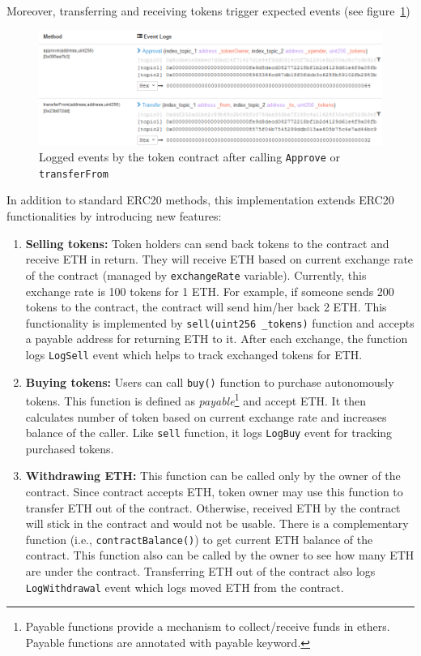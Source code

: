 Moreover, transferring and receiving tokens trigger expected events (see figure~\ref{fig:proptran})

\begin{figure}[t]
	\centering
	\includegraphics[width=1.0\linewidth]{figures/img18.png}
	\caption{Logged events by the token contract after calling \texttt{Approve} or \texttt{transferFrom}}
	\label{fig:proptran}
\end{figure}

In addition to standard ERC20 methods, this implementation extends ERC20 functionalities by introducing new features:

\begin{enumerate}
	\item \textbf{Selling tokens:} Token holders can send back tokens to the contract and receive ETH in return. They will receive ETH based on current exchange rate of the contract (managed by \texttt{exchangeRate} variable). Currently, this exchange rate is 100 tokens for 1 ETH. For example, if someone sends 200 tokens to the contract, the contract will send him/her back 2 ETH. This functionality is implemented by \texttt{sell(uint256 \_tokens)} function and accepts a payable address for returning ETH to it. After each exchange, the function logs \texttt{LogSell} event which helps to track exchanged tokens for ETH.
	\item \textbf{Buying tokens:} Users can call \texttt{buy()} function to purchase autonomously tokens. This function is defined as \textit{payable}\footnote{Payable functions provide a mechanism to collect/receive funds in ethers. Payable functions are annotated with payable keyword.} and accept ETH. It then calculates number of token based on current exchange rate and increases balance of the caller. Like \texttt{sell} function, it logs \texttt{LogBuy} event for tracking purchased tokens.
	\item \textbf{Withdrawing ETH:} This function can be called only by the owner of the contract. Since contract accepts ETH, token owner may use this function to transfer ETH out of the contract. Otherwise, received ETH by the contract will stick in the contract and would not be usable. There is a complementary function (i.e., \texttt{contractBalance()}) to get current ETH balance of the contract. This function also can be called by the owner to see how many ETH are under the contract. Transferring ETH out of the contract also logs \texttt{LogWithdrawal} event which logs moved ETH from the contract.
\end{enumerate}

